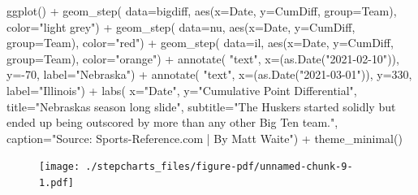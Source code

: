 \documentclass[
  letterpaper,
  DIV=11,
  numbers=noendperiod]{scrreprt}
\newenvironment{Shaded}{\begin{snugshade}}{\end{snugshade}}
\newcommand{\AttributeTok}[1]{\textcolor[rgb]{0.40,0.45,0.13}{#1}}
\newcommand{\DecValTok}[1]{\textcolor[rgb]{0.68,0.00,0.00}{#1}}
\newcommand{\FunctionTok}[1]{\textcolor[rgb]{0.28,0.35,0.67}{#1}}
\newcommand{\NormalTok}[1]{\textcolor[rgb]{0.00,0.23,0.31}{#1}}
\newcommand{\SpecialCharTok}[1]{\textcolor[rgb]{0.37,0.37,0.37}{#1}}
\newcommand{\StringTok}[1]{\textcolor[rgb]{0.13,0.47,0.30}{#1}}
\begin{document}
\begin{Shaded}
\begin{Highlighting}[]
\FunctionTok{ggplot}\NormalTok{() }\SpecialCharTok{+} 
  \FunctionTok{geom\_step}\NormalTok{(}
    \AttributeTok{data=}\NormalTok{bigdiff, }
    \FunctionTok{aes}\NormalTok{(}\AttributeTok{x=}\NormalTok{Date, }\AttributeTok{y=}\NormalTok{CumDiff, }\AttributeTok{group=}\NormalTok{Team), }
    \AttributeTok{color=}\StringTok{"light grey"}\NormalTok{) }\SpecialCharTok{+}
  \FunctionTok{geom\_step}\NormalTok{(}
    \AttributeTok{data=}\NormalTok{nu, }
    \FunctionTok{aes}\NormalTok{(}\AttributeTok{x=}\NormalTok{Date, }\AttributeTok{y=}\NormalTok{CumDiff, }\AttributeTok{group=}\NormalTok{Team), }
    \AttributeTok{color=}\StringTok{"red"}\NormalTok{) }\SpecialCharTok{+} 
  \FunctionTok{geom\_step}\NormalTok{(}
    \AttributeTok{data=}\NormalTok{il, }
    \FunctionTok{aes}\NormalTok{(}\AttributeTok{x=}\NormalTok{Date, }\AttributeTok{y=}\NormalTok{CumDiff, }\AttributeTok{group=}\NormalTok{Team), }
    \AttributeTok{color=}\StringTok{"orange"}\NormalTok{) }\SpecialCharTok{+}
  \FunctionTok{annotate}\NormalTok{(}
    \StringTok{"text"}\NormalTok{, }
    \AttributeTok{x=}\NormalTok{(}\FunctionTok{as.Date}\NormalTok{(}\StringTok{"2021{-}02{-}10"}\NormalTok{)), }
    \AttributeTok{y=}\SpecialCharTok{{-}}\DecValTok{70}\NormalTok{, }
    \AttributeTok{label=}\StringTok{"Nebraska"}\NormalTok{) }\SpecialCharTok{+}
  \FunctionTok{annotate}\NormalTok{(}
    \StringTok{"text"}\NormalTok{, }
    \AttributeTok{x=}\NormalTok{(}\FunctionTok{as.Date}\NormalTok{(}\StringTok{"2021{-}03{-}01"}\NormalTok{)), }
    \AttributeTok{y=}\DecValTok{330}\NormalTok{, }
    \AttributeTok{label=}\StringTok{"Illinois"}\NormalTok{) }\SpecialCharTok{+}
  \FunctionTok{labs}\NormalTok{(}
    \AttributeTok{x=}\StringTok{"Date"}\NormalTok{, }
    \AttributeTok{y=}\StringTok{"Cumulative Point Differential"}\NormalTok{, }
    \AttributeTok{title=}\StringTok{"Nebraska\textquotesingle{}s season long slide"}\NormalTok{, }
    \AttributeTok{subtitle=}\StringTok{"The Huskers started solidly but ended up being outscored by more than any other Big Ten team."}\NormalTok{, }
    \AttributeTok{caption=}\StringTok{"Source: Sports{-}Reference.com | By Matt Waite"}\NormalTok{) }\SpecialCharTok{+}
  \FunctionTok{theme\_minimal}\NormalTok{()}
\end{Highlighting}
\end{Shaded}

\begin{figure}[H]

{\centering \texttt{[image: ./stepcharts\_files/figure-pdf/unnamed-chunk-9-1.pdf]}

}

\end{figure}
\end{document}
